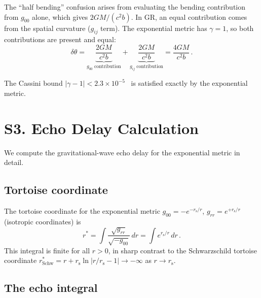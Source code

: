 \documentclass[aps,prd,preprint,superscriptaddress,longbibliography]{revtex4-2}
\newcommand{\rs}{r_{\mathrm{s}}}
\begin{document}
The ``half bending'' confusion arises from evaluating the bending
contribution from $g_{00}$ alone, which gives $2GM/(c^2 b)$.  In GR,
an equal contribution comes from the spatial curvature ($g_{ij}$
term).  The exponential metric has $\gamma = 1$, so both contributions
are present and equal:
\begin{equation}
  \delta\theta = \underbrace{\frac{2GM}{c^2 b}}_{g_{00}\;\text{contribution}}
  + \underbrace{\frac{2GM}{c^2 b}}_{g_{ij}\;\text{contribution}}
  = \frac{4GM}{c^2 b}\,.
  \label{eq:bending_decomposed}
\end{equation}

The Cassini bound $|\gamma - 1| < 2.3 \times 10^{-5}$~\cite{Bertotti2003}
is satisfied exactly by the exponential metric.

\section{S3. Echo Delay Calculation}
\label{sec:echo_detail}

We compute the gravitational-wave echo delay for the exponential
metric in detail.

\subsection{Tortoise coordinate}

The tortoise coordinate for the exponential metric
$g_{00} = -e^{-\rs/r}$, $g_{rr} = e^{+\rs/r}$ (isotropic
coordinates) is
\begin{equation}
  r^* = \int \frac{\sqrt{g_{rr}}}{\sqrt{-g_{00}}}\,dr
  = \int e^{\rs/r}\,dr\,.
  \label{eq:tortoise_exp}
\end{equation}
This integral is finite for all $r > 0$, in sharp contrast to the
Schwarzschild tortoise coordinate
$r^*_{\mathrm{Schw}} = r + \rs\ln|r/\rs - 1| \to -\infty$ as
$r \to \rs$.

\subsection{The echo integral}
\end{document}
